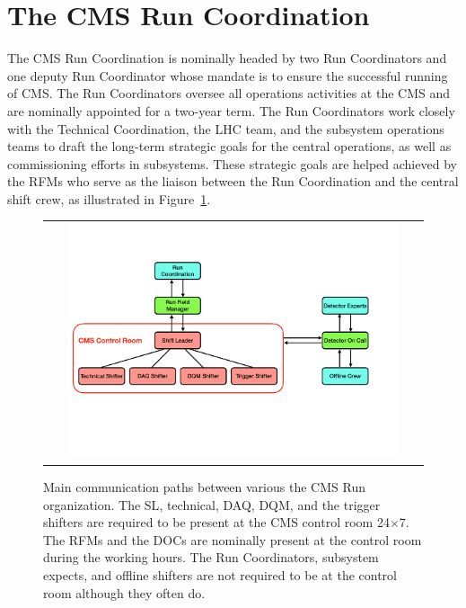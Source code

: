 \section{The CMS Run Coordination}
\label{sec:RC}

The \ac{CMS} Run Coordination is nominally headed by two Run Coordinators and one deputy Run Coordinator whose mandate is to ensure the successful running of \ac{CMS}. The Run Coordinators oversee all operations activities at the \ac{CMS} and are nominally appointed for a two-year term. The Run Coordinators work closely with the Technical Coordination, the \ac{LHC} team, and the subsystem operations teams to draft the long-term strategic goals for the central operations, as well as commissioning efforts in subsystems. These strategic goals are helped achieved by the \acp{RFM} who serve as the liaison between the Run Coordination and the central shift crew, as illustrated in Figure~\ref{fig:RC}.

\begin{figure}[tbh!]
 \begin{center}
 \begin{tabular}{c}
 \includegraphics[width=0.9\textwidth]{figures/Part2/Operation/RC}
 \end{tabular}
 \caption{Main communication paths between various  the \ac{CMS} Run organization. The \ac{SL}, technical, \ac{DAQ}, \ac{DQM}, and the trigger shifters are required to be present at the \ac{CMS} control room 24$\times$7. The \acp{RFM} and the \acp{DOC} are nominally present at the control room during the working hours. The Run Coordinators, subsystem expects, and offline shifters are not required to be at the control room although they often do.}
 \label{fig:RC}
 \end{center}
\end{figure}

